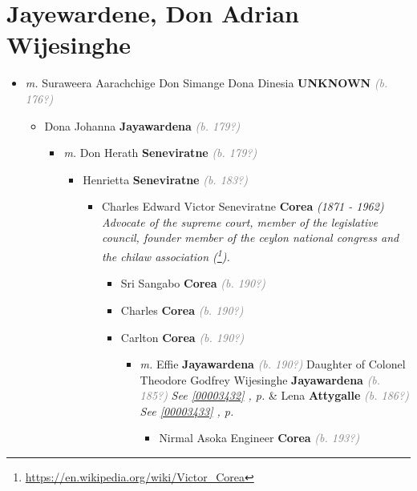 \documentclass[10pt, openany]{book}
\begin{document}
\chapter{Jayewardene, Don Adrian Wijesinghe}
\label{00002606}
\textcolor{slmaroon}{\textit{}}
\begin{itemize}
\item{\textit{m.} Suraweera Aarachchige Don Simange Dona Dinesia \textbf{UNKNOWN} \textcolor{gray}{\textit{(b. 176?)}}   \label{couple:00002606:00003010} \begin{itemize}
\item{Dona Johanna \textbf{Jayawardena} \textcolor{gray}{\textit{(b. 179?)}}
\begin{itemize}
\item{\textit{m.} Don Herath \textbf{Seneviratne} \textcolor{gray}{\textit{(b. 179?)}}   \label{couple:00003011:00003012} \begin{itemize}
\item{Henrietta \textbf{Seneviratne} \textcolor{gray}{\textit{(b. 183?)}}
\begin{itemize}
\item{Charles Edward Victor Seneviratne \textbf{Corea} \textcolor{slorange}{\textit{(1871 - 1962)}} \textcolor{slmaroon}{\textit{Advocate of the supreme court, member of the legislative council, founder member of the ceylon national congress and the chilaw association (\footnote{\url{https://en.wikipedia.org/wiki/Victor_Corea}}).}}
\begin{itemize}
\item{Sri Sangabo \textbf{Corea} \textcolor{gray}{\textit{(b. 190?)}}
  }
\item{Charles  \textbf{Corea} \textcolor{gray}{\textit{(b. 190?)}}
  }
\item{Carlton \textbf{Corea} \textcolor{gray}{\textit{(b. 190?)}}
\begin{itemize}
\item{\textit{m.} Effie \textbf{Jayawardena} \textcolor{gray}{\textit{(b. 190?)}} Daughter of  Colonel Theodore Godfrey Wijesinghe \textbf{Jayawardena} \textcolor{gray}{\textit{(b. 185?)}} \textcolor{slteal}{\textit{See  \autoref{00003432} \textit{, p. \pageref{00003432} }}}  \&  Lena \textbf{Attygalle} \textcolor{gray}{\textit{(b. 186?)}} \textcolor{slteal}{\textit{See  \autoref{00003433} \textit{, p. \pageref{00003433} }}}   \label{couple:00002509:00003437} \begin{itemize}
\item{Nirmal Asoka  Engineer \textbf{Corea} \textcolor{gray}{\textit{(b. 193?)}}
}
\end{itemize}}
\end{itemize}}
\end{itemize}}
\end{itemize}}
\end{itemize}}
\end{itemize}}
\end{itemize}}
\end{itemize}
\end{document}
